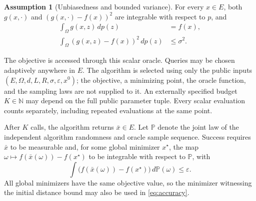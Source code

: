 \documentclass[10pt]{article}
\theoremstyle{definition}
\newtheorem{assumption}{Assumption}
\begin{document}
\begin{assumption}[Unbiasedness and bounded variance]
For every $x\in E$, both $g(x,\cdot)$ and $(g(x,\cdot)-f(x))^2$ are integrable with respect to $p$, and
\begin{align}
\int_{\Omega} g(x,z)\,dp(z) &= f(x),\\
\int_{\Omega} (g(x,z)-f(x))^2\,dp(z) &\leq \sigma^2.
\end{align}
\end{assumption}

The objective is accessed through this scalar oracle. Queries may be chosen adaptively anywhere in $E$. The algorithm is selected using only the public inputs $(E,\Omega,d,L,R,\sigma,\varepsilon,x^0)$; the objective, a minimizing point, the oracle function, and the sampling laws are not supplied to it. An externally specified budget $K\in\mathbb{N}$ may depend on the full public parameter tuple. Every scalar evaluation counts separately, including repeated evaluations at the same point.

After $K$ calls, the algorithm returns $\bar{x}\in E$. Let $\mathbb{P}$ denote the joint law of the independent algorithm randomness and oracle sample sequence. Success requires $\bar{x}$ to be measurable and, for some global minimizer $x^\star$, the map $\omega\mapsto f(\bar{x}(\omega))-f(x^\star)$ to be integrable with respect to $\mathbb{P}$, with
\begin{equation}
\label{eq:accuracy}
\int \bigl(f(\bar{x}(\omega))-f(x^\star)\bigr)\,d\mathbb{P}(\omega)
\leq \varepsilon.
\end{equation}
All global minimizers have the same objective value, so the minimizer witnessing the initial distance bound may also be used in \eqref{eq:accuracy}.
\end{document}
